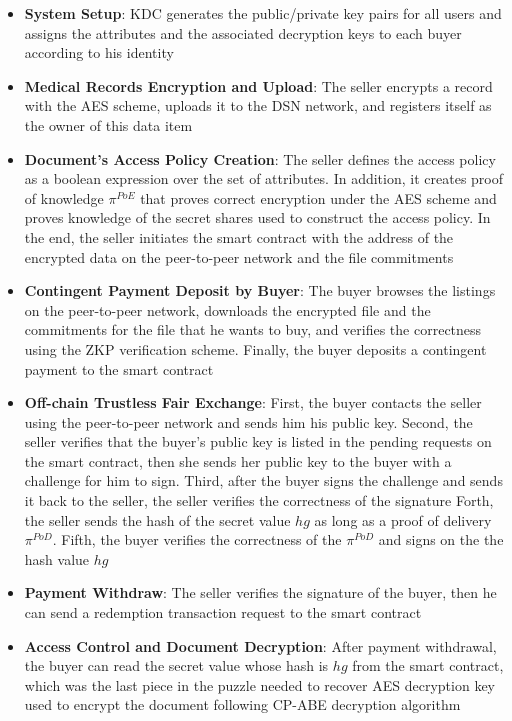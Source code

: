 \begin{itemize}
    \item \textbf{System Setup}: KDC generates the public/private key pairs for all users and assigns the attributes and the associated decryption keys to each buyer according to his identity
    \item \textbf{Medical Records Encryption and Upload}:  The seller encrypts a record with the AES scheme, uploads it to the DSN network, and registers itself as the owner of this data item
    \item \textbf{Document's Access Policy Creation}: The seller defines the access policy as a boolean expression over the set of attributes.
    In addition, it creates proof of knowledge $\pi^{PoE}$ that proves correct encryption under the AES scheme and proves knowledge of the secret shares used to construct the access policy.
    In the end, the seller initiates the smart contract with the address of the encrypted data on the peer-to-peer network and the file commitments
    \item \textbf{Contingent Payment Deposit by Buyer}: The buyer browses the listings on the peer-to-peer network, downloads the encrypted file and the commitments for the file that he wants to buy, and verifies the correctness using the ZKP verification scheme.
    Finally, the buyer deposits a contingent payment to the smart contract
    \item \textbf{Off-chain Trustless Fair Exchange}: First, the buyer contacts the seller using the peer-to-peer network and sends him his public key.
    Second, the seller verifies that the buyer's public key is listed in the pending requests on the smart contract, then she sends her public key to the buyer with a challenge for him to sign.
    Third, after the buyer signs the challenge and sends it back to the seller, the seller verifies the correctness of the signature
    Forth, the seller sends the hash of the secret value $hg$ as long as a proof of delivery $\pi^{PoD}$.
    Fifth, the buyer verifies the correctness of the $\pi^{PoD}$ and signs on the the hash value $hg$
    \item \textbf{Payment Withdraw}: The seller verifies the signature of the buyer, then he can send a redemption transaction request to the smart contract
    \item \textbf{Access Control and Document Decryption}: After payment withdrawal, the buyer can read the secret value whose hash is $hg$ from the smart contract, which was the last piece in the puzzle needed to recover AES decryption key used to encrypt the document following CP-ABE decryption algorithm
    
\end{itemize}
